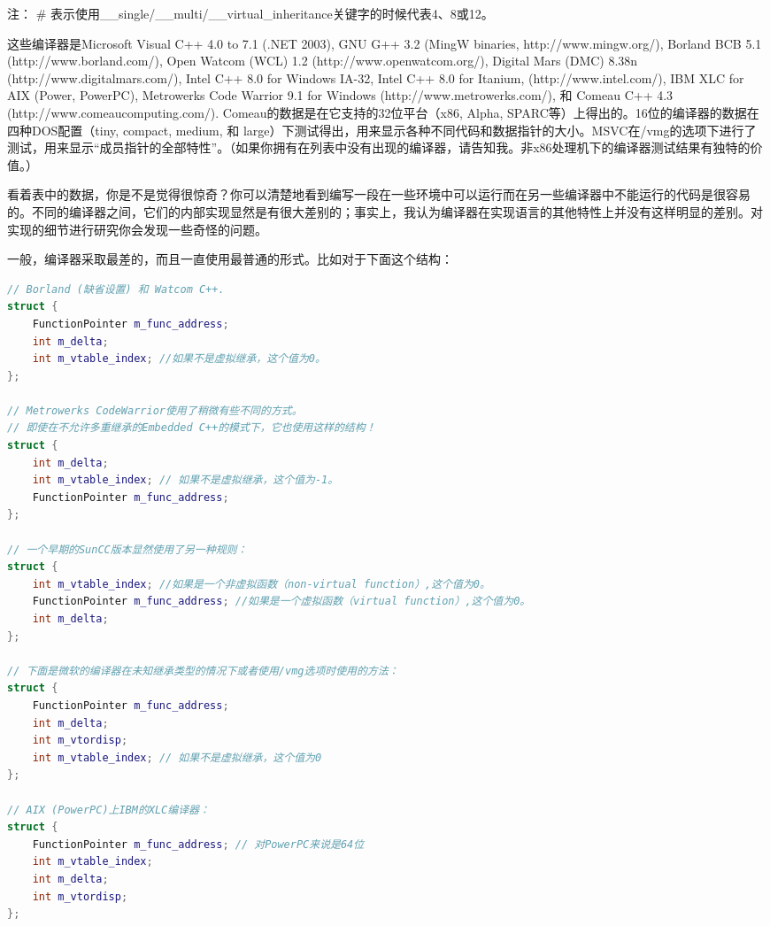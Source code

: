 \documentclass{article}
\begin{document}
\begin{CJK}{UTF8}{gbsn}
注： \# 表示使用\_\_single/\_\_multi/\_\_virtual\_inheritance关键字的时候代表4、8或12。

这些编译器是Microsoft Visual C++ 4.0 to 7.1 (.NET 2003), GNU G++ 3.2 (MingW binaries, http://www.mingw.org/), Borland BCB 5.1 (http://www.borland.com/), Open Watcom (WCL) 1.2 (http://www.openwatcom.org/), Digital Mars (DMC) 8.38n (http://www.digitalmars.com/), Intel C++ 8.0 for Windows IA-32, Intel C++ 8.0 for Itanium, (http://www.intel.com/), IBM XLC for AIX (Power, PowerPC), Metrowerks Code Warrior 9.1 for Windows (http://www.metrowerks.com/), 和 Comeau C++ 4.3 (http://www.comeaucomputing.com/). Comeau的数据是在它支持的32位平台（x86, Alpha, SPARC等）上得出的。16位的编译器的数据在四种DOS配置（tiny, compact, medium, 和 large）下测试得出，用来显示各种不同代码和数据指针的大小。MSVC在/vmg的选项下进行了测试，用来显示“成员指针的全部特性”。（如果你拥有在列表中没有出现的编译器，请告知我。非x86处理机下的编译器测试结果有独特的价值。）

看着表中的数据，你是不是觉得很惊奇？你可以清楚地看到编写一段在一些环境中可以运行而在另一些编译器中不能运行的代码是很容易的。不同的编译器之间，它们的内部实现显然是有很大差别的；事实上，我认为编译器在实现语言的其他特性上并没有这样明显的差别。对实现的细节进行研究你会发现一些奇怪的问题。

一般，编译器采取最差的，而且一直使用最普通的形式。比如对于下面这个结构：
\begin{lstlisting}[language=c++]
// Borland (缺省设置) 和 Watcom C++. 
struct {
    FunctionPointer m_func_address;
    int m_delta;
    int m_vtable_index; //如果不是虚拟继承，这个值为0。
};

// Metrowerks CodeWarrior使用了稍微有些不同的方式。
// 即使在不允许多重继承的Embedded C++的模式下，它也使用这样的结构！
struct {
    int m_delta;
    int m_vtable_index; // 如果不是虚拟继承，这个值为-1。
    FunctionPointer m_func_address;
};

// 一个早期的SunCC版本显然使用了另一种规则： 
struct {
    int m_vtable_index; //如果是一个非虚拟函数（non-virtual function）,这个值为0。
    FunctionPointer m_func_address; //如果是一个虚拟函数（virtual function）,这个值为0。
    int m_delta;
};

// 下面是微软的编译器在未知继承类型的情况下或者使用/vmg选项时使用的方法：
struct {
    FunctionPointer m_func_address;
    int m_delta;
    int m_vtordisp;
    int m_vtable_index; // 如果不是虚拟继承，这个值为0
};

// AIX (PowerPC)上IBM的XLC编译器：
struct {
    FunctionPointer m_func_address; // 对PowerPC来说是64位
    int m_vtable_index; 
    int m_delta; 
    int m_vtordisp;
};


\end{lstlisting}
\end{CJK}
\end{document}
